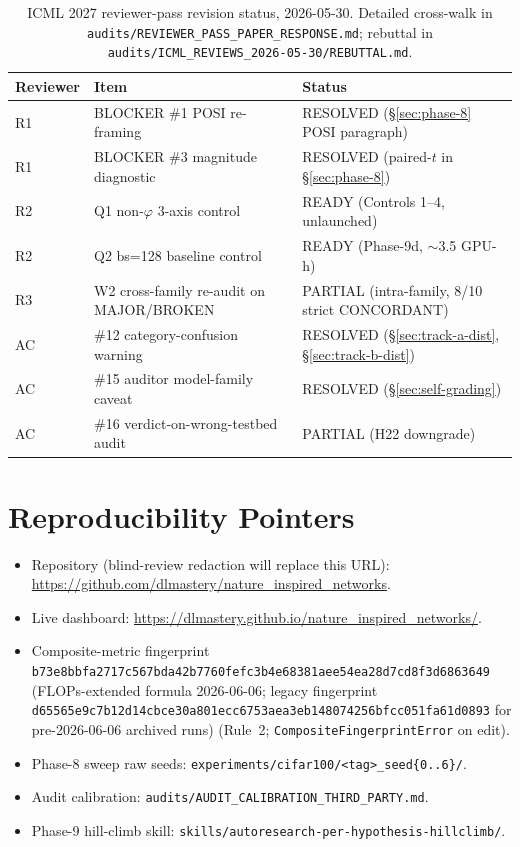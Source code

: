 \documentclass{article}
\begin{document}
\begin{table}[h!]
\small\centering
\caption{ICML 2027 reviewer-pass revision status, 2026-05-30.
Detailed cross-walk in
\texttt{audits/REVIEWER\_PASS\_PAPER\_RESPONSE.md}; rebuttal in
\texttt{audits/ICML\_REVIEWS\_2026-05-30/REBUTTAL.md}.}
\label{tab:rev-status}
\begin{tabular}{l l l}
\toprule
Reviewer & Item & Status \\
\midrule
R1       & BLOCKER \#1 POSI re-framing                  & RESOLVED (\S\ref{sec:phase-8} POSI paragraph) \\
R1       & BLOCKER \#3 magnitude diagnostic             & RESOLVED (paired-$t$ in \S\ref{sec:phase-8}) \\
R2       & Q1 non-$\varphi$ 3-axis control              & READY (Controls 1--4, unlaunched) \\
R2       & Q2 bs=128 baseline control                   & READY (Phase-9d, $\sim$3.5 GPU-h) \\
R3       & W2 cross-family re-audit on MAJOR/BROKEN     & PARTIAL (intra-family, 8/10 strict CONCORDANT) \\
AC       & \#12 category-confusion warning              & RESOLVED (\S\ref{sec:track-a-dist}, \S\ref{sec:track-b-dist}) \\
AC       & \#15 auditor model-family caveat             & RESOLVED (\S\ref{sec:self-grading}) \\
AC       & \#16 verdict-on-wrong-testbed audit          & PARTIAL (H22 downgrade) \\
\bottomrule
\end{tabular}
\end{table}

\section{Reproducibility Pointers}
\label{app:repro}

\begin{itemize}
  \item Repository (blind-review redaction will replace this URL):
        \url{https://github.com/dlmastery/nature_inspired_networks}.
  \item Live dashboard:
        \url{https://dlmastery.github.io/nature_inspired_networks/}.
  \item Composite-metric fingerprint
        \texttt{b73e8bbfa2717c567bda42b7760fefc3b4e68381aee54ea28d7cd8f3d6863649}
        (FLOPs-extended formula 2026-06-06; legacy fingerprint
        \texttt{d65565e9c7b12d14cbce30a801ecc6753aea3eb148074256bfcc051fa61d0893}
        for pre-2026-06-06 archived runs)
        (Rule~2; \texttt{CompositeFingerprintError} on edit).
  \item Phase-8 sweep raw seeds:
        \texttt{experiments/cifar100/<tag>\_seed\{0..6\}/}.
  \item Audit calibration:
        \texttt{audits/AUDIT\_CALIBRATION\_THIRD\_PARTY.md}.
  \item Phase-9 hill-climb skill:
        \texttt{skills/autoresearch-per-hypothesis-hillclimb/}.
\end{itemize}
\end{document}
